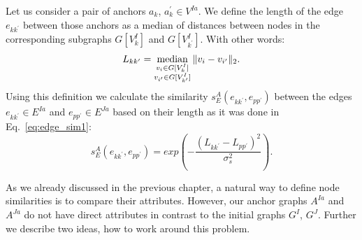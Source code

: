 Let us consider a pair of anchors  $a_k$, $a_k^\prime\in V^{Ia}$. We define the length of the edge $e_{kk^{\prime}}$ between those anchors as a median of distances between nodes in the corresponding subgraphs $G[V^I_k]$ and $G[V^I_{k^\prime}]$. With other words:
\begin{equation} L_{kk^\prime} = \mathop{\rm median}_{\substack{v_i\in G[V^I_k]\\ v_{i^\prime}\in G[V^I_{k^\prime}]} }\|v_i-v_{i^\prime}\|_{2}. \end{equation}
Using this definition we calculate the similarity $s^A_E(e_{kk^\prime}, e_{pp^\prime})$ between the edges $e_{kk^\prime}\in E^{Ia}$ and $e_{pp^\prime}\in E^{Ja}$ based on their length as it was done in Eq.~\eqref{eq:edge_sim1}:
\begin{equation*}
s^A_E(e_{kk^\prime}, e_{pp^\prime}) = exp(-\frac{(L_{kk^\prime} - L_{pp^\prime})^2}{\sigma^2_{s}}).
\label{eq:s_e_A}
\end{equation*}

As we already discussed in the previous chapter, a natural way to define node similarities is to compare their attributes. However, our anchor graphs $A^{Ia}$ and $A^{Ja}$ do not have direct attributes in contrast to the initial graphs $G^I$, $G^J$. Further we describe two ideas, how to work around this problem. %

